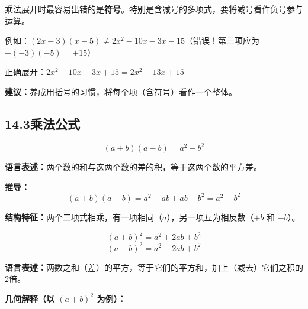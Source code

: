 \documentclass[12pt, a4paper]{ctexart}
\begin{document}
\begin{warnbox}
乘法展开时最容易出错的是\textbf{符号}。特别是含减号的多项式，要将减号看作负号参与运算。

例如：$(2x - 3)(x - 5) \neq 2x^2 - 10x - 3x - 15$（错误！第三项应为 $+(-3)(-5) = +15$）

正确展开：$2x^2 - 10x - 3x + 15 = 2x^2 - 13x + 15$

\textbf{建议：}养成用括号的习惯，将每个项（含符号）看作一个整体。
\end{warnbox}

\subsection*{14.3\quad 乘法公式}

\begin{knowledgebox}[平方差公式]
$$\boxed{(a + b)(a - b) = a^2 - b^2}$$

\textbf{语言表述：}两个数的和与这两个数的差的积，等于这两个数的平方差。

\textbf{推导：}
$$(a + b)(a - b) = a^2 - ab + ab - b^2 = a^2 - b^2$$

\textbf{结构特征：}两个二项式相乘，有一项相同（$a$），另一项互为相反数（$+b$ 和 $-b$）。
\end{knowledgebox}

\begin{knowledgebox}[完全平方公式]
$$\boxed{(a + b)^2 = a^2 + 2ab + b^2}$$
$$\boxed{(a - b)^2 = a^2 - 2ab + b^2}$$

\textbf{语言表述：}两数之和（差）的平方，等于它们的平方和，加上（减去）它们之积的$2$倍。

\textbf{几何解释（以 $(a+b)^2$ 为例）：}
\end{knowledgebox}

\begin{center}
\end{center}
\end{document}
